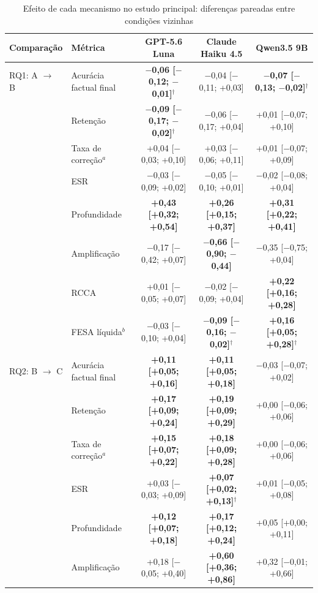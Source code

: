\begin{table}[t]
\caption{Efeito de cada mecanismo no estudo principal: diferenças pareadas entre condições vizinhas}
\label{tab:deltas}
\centering
\footnotesize
\setlength{\tabcolsep}{4pt}
\begin{tabular}{|l|l|c|c|c|}
\hline
\textbf{Comparação} & \textbf{Métrica} & \textbf{GPT-5.6 Luna} & \textbf{Claude Haiku 4.5} & \textbf{Qwen3.5 9B} \\
\hline
RQ1: A $\to$ B & Acurácia factual final & \textbf{$-$0,06 [$-$0,12; $-$0,01]}$^{\dagger}$ & $-$0,04 [$-$0,11; +0,03] & \textbf{$-$0,07 [$-$0,13; $-$0,02]}$^{\dagger}$ \\
 & Retenção & \textbf{$-$0,09 [$-$0,17; $-$0,02]}$^{\dagger}$ & $-$0,06 [$-$0,17; +0,04] & +0,01 [$-$0,07; +0,10] \\
 & Taxa de correção$^{a}$ & +0,04 [$-$0,03; +0,10] & +0,03 [$-$0,06; +0,11] & +0,01 [$-$0,07; +0,09] \\
 & ESR & $-$0,03 [$-$0,09; +0,02] & $-$0,05 [$-$0,10; +0,01] & $-$0,02 [$-$0,08; +0,04] \\
 & Profundidade & \textbf{+0,43 [+0,32; +0,54]} & \textbf{+0,26 [+0,15; +0,37]} & \textbf{+0,31 [+0,22; +0,41]} \\
 & Amplificação & $-$0,17 [$-$0,42; +0,07] & \textbf{$-$0,66 [$-$0,90; $-$0,44]} & $-$0,35 [$-$0,75; +0,04] \\
 & RCCA & +0,01 [$-$0,05; +0,07] & $-$0,02 [$-$0,09; +0,04] & \textbf{+0,22 [+0,16; +0,28]} \\
 & FESA líquida$^{b}$ & $-$0,03 [$-$0,10; +0,04] & \textbf{$-$0,09 [$-$0,16; $-$0,02]}$^{\dagger}$ & \textbf{+0,16 [+0,05; +0,28]}$^{\dagger}$ \\
\hline
RQ2: B $\to$ C & Acurácia factual final & \textbf{+0,11 [+0,05; +0,16]} & \textbf{+0,11 [+0,05; +0,18]} & $-$0,03 [$-$0,07; +0,02] \\
 & Retenção & \textbf{+0,17 [+0,09; +0,24]} & \textbf{+0,19 [+0,09; +0,29]} & +0,00 [$-$0,06; +0,06] \\
 & Taxa de correção$^{a}$ & \textbf{+0,15 [+0,07; +0,22]} & \textbf{+0,18 [+0,09; +0,28]} & +0,00 [$-$0,06; +0,06] \\
 & ESR & +0,03 [$-$0,03; +0,09] & \textbf{+0,07 [+0,02; +0,13]}$^{\dagger}$ & +0,01 [$-$0,05; +0,08] \\
 & Profundidade & \textbf{+0,12 [+0,07; +0,18]} & \textbf{+0,17 [+0,12; +0,24]} & +0,05 [+0,00; +0,11] \\
 & Amplificação & +0,18 [$-$0,05; +0,40] & \textbf{+0,60 [+0,36; +0,86]} & +0,32 [$-$0,01; +0,66] \\

\end{tabular}
\end{table}
